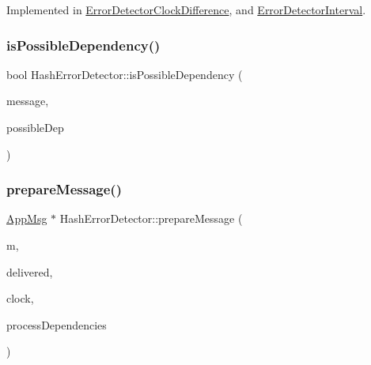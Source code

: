 Implemented in \hyperlink{classErrorDetectorClockDifference_ab20aa1671eb558dea6f06b2440e97e41}{Error\+Detector\+Clock\+Difference}, and \hyperlink{classErrorDetectorInterval_a33bf470042fb65d833fd0f091374a046}{Error\+Detector\+Interval}.

\mbox{\label{classHashErrorDetector_aaaceeb3d2d27d5f3c85a9b80f959e0fe}} 
\subsubsection{\texorpdfstring{is\+Possible\+Dependency()}{isPossibleDependency()}}
{\footnotesize\ttfamily bool Hash\+Error\+Detector\+::is\+Possible\+Dependency (\begin{DoxyParamCaption}\item[{const \hyperlink{structures_8h_a7e7bdc1d2fff8a9436f2f352b2711ed6}{message\+Info} \&}]{message,  }\item[{const \hyperlink{structures_8h_a7e7bdc1d2fff8a9436f2f352b2711ed6}{message\+Info} \&}]{possible\+Dep }\end{DoxyParamCaption})}

\mbox{\label{classHashErrorDetector_a2b1dad6a83a08fd7ce88e32f84638459}} 
\subsubsection{\texorpdfstring{prepare\+Message()}{prepareMessage()}}
{\footnotesize\ttfamily \hyperlink{classAppMsg}{App\+Msg} $\ast$ Hash\+Error\+Detector\+::prepare\+Message (\begin{DoxyParamCaption}\item[{\hyperlink{classAppMsg}{App\+Msg} $\ast$}]{m,  }\item[{const vector$<$ \hyperlink{structures_8h_a7e7bdc1d2fff8a9436f2f352b2711ed6}{message\+Info} $>$ \&}]{delivered,  }\item[{const \hyperlink{classProbabilisticClock}{Probabilistic\+Clock} \&}]{clock,  }\item[{const \hyperlink{classTotalDependencies}{Total\+Dependencies} \&}]{process\+Dependencies }\end{DoxyParamCaption})\hspace{0.3cm}{\ttfamily [virtual]}}




